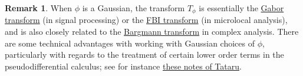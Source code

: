 \documentclass[11pt]{article}
\theoremstyle{definition}
\newtheorem{remark}[theorem]{Remark}
\begin{document}
\begin{remark}
  When \({\phi}\) is a Gaussian, the transform \({T_\phi}\) is essentially the \href{https://en.wikipedia.org/wiki/Gabor_transform}{Gabor transform} (in signal processing) or the \href{https://en.wikipedia.org/wiki/Fourier%E2%80%93Bros%E2%80%93Iagolnitzer_transform}{FBI transform} (in microlocal analysis), and is also closely related to the \href{https://en.wikipedia.org/wiki/Segal%E2%80%93Bargmann_space#The_Segal%E2%80%93Bargmann_transform}{Bargmann transform} in complex analysis. There are some technical advantages with working with Gaussian choices of \({\phi}\), particularly with regards to the treatment of certain lower order terms in the pseudodifferential calculus; see for instance \href{https://math.berkeley.edu/~tataru/papers/phasespace.pdf}{these notes of Tataru}. 
\end{remark}
\end{document}
